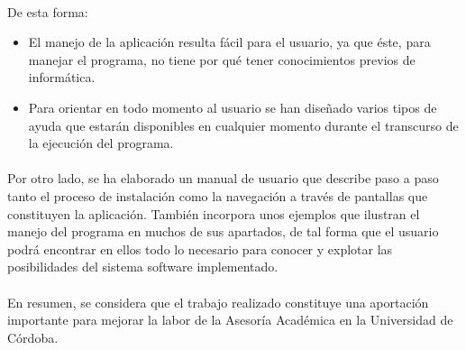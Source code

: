 \paragraph{}De esta forma:

\begin{itemize}
 \item El manejo de la aplicación resulta fácil para el usuario, ya que éste,
 para manejar el programa, no tiene por qué tener conocimientos previos de
 informática.
 \item Para orientar en todo momento al usuario se han diseñado varios tipos de
 ayuda que estarán disponibles en cualquier momento durante el transcurso de la
 ejecución del programa.
\end{itemize}

\paragraph{}Por otro lado, se ha elaborado un manual de usuario que describe
paso a paso tanto el proceso de instalación como la navegación a través de
pantallas que constituyen la aplicación. También incorpora unos ejemplos que
ilustran el manejo del programa en muchos de sus apartados, de tal forma que el
usuario podrá encontrar en ellos todo lo necesario para conocer y explotar las
posibilidades del sistema software implementado.

\paragraph{}En resumen, se considera que el trabajo realizado constituye una
aportación importante para mejorar la labor de la Asesoría Académica en la
Universidad de Córdoba.
